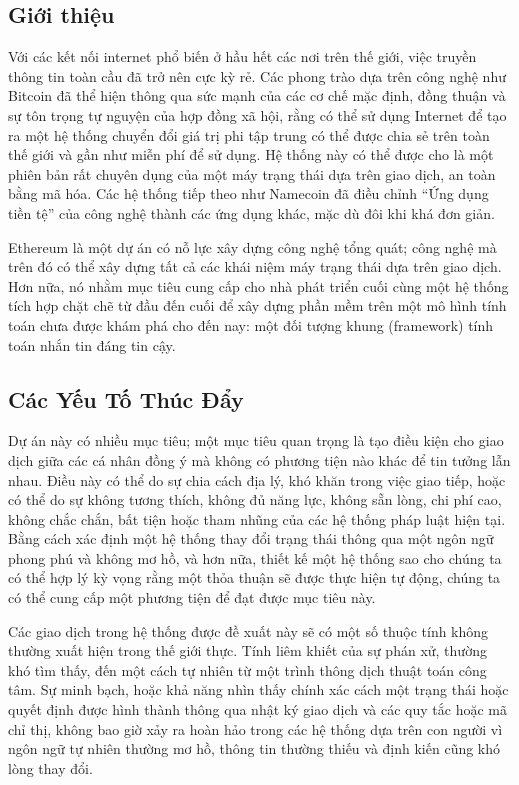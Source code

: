 \documentclass[9pt,oneside]{amsart}
\begin{document}
\setlength{\columnsep}{20pt}
\begin{multicols}{2}

\section[utf8]{Giới thiệu}\label{sec:introduction}

Với các kết nối internet phổ biến ở hầu hết các nơi trên thế giới, việc truyền thông tin toàn cầu đã trở nên cực kỳ rẻ. Các phong trào dựa trên công nghệ như Bitcoin đã thể hiện thông qua sức mạnh của các cơ chế mặc định, đồng thuận và sự tôn trọng tự nguyện của hợp đồng xã hội, rằng có thể sử dụng Internet để tạo ra một hệ thống chuyển đổi giá trị phi tập trung có thể được chia sẻ trên toàn thế giới và gần như miễn phí để sử dụng. Hệ thống này có thể được cho là một phiên bản rất chuyên dụng của một máy trạng thái dựa trên giao dịch, an toàn bằng mã hóa. Các hệ thống tiếp theo như Namecoin đã điều chỉnh ``Ứng dụng tiền tệ'' của công nghệ thành các ứng dụng khác, mặc dù đôi khi khá đơn giản.

Ethereum là một dự án có nỗ lực xây dựng công nghệ tổng quát; công nghệ mà trên đó có thể xây dựng tất cả các khái niệm máy trạng thái dựa trên giao dịch. Hơn nữa, nó nhằm mục tiêu cung cấp cho nhà phát triển cuối cùng một hệ thống tích hợp chặt chẽ từ đầu đến cuối để xây dựng phần mềm trên một mô hình tính toán chưa được khám phá cho đến nay: một đối tượng khung (framework) tính toán nhắn tin đáng tin cậy.

\subsection{Các Yếu Tố Thúc Đẩy} \label{ch:driving}

Dự án này có nhiều mục tiêu; một mục tiêu quan trọng là tạo điều kiện cho giao dịch giữa các cá nhân đồng ý mà không có phương tiện nào khác để tin tưởng lẫn nhau. Điều này có thể do sự chia cách địa lý, khó khăn trong việc giao tiếp, hoặc có thể do sự không tương thích, không đủ năng lực, không sẵn lòng, chi phí cao, không chắc chắn, bất tiện hoặc tham nhũng của các hệ thống pháp luật hiện tại. Bằng cách xác định một hệ thống thay đổi trạng thái thông qua một ngôn ngữ phong phú và không mơ hồ, và hơn nữa, thiết kế một hệ thống sao cho chúng ta có thể hợp lý kỳ vọng rằng một thỏa thuận sẽ được thực hiện tự động, chúng ta có thể cung cấp một phương tiện để đạt được mục tiêu này.

Các giao dịch trong hệ thống được đề xuất này sẽ có một số thuộc tính không thường xuất hiện trong thế giới thực. Tính liêm khiết của sự phán xử, thường khó tìm thấy, đến một cách tự nhiên từ một trình thông dịch thuật toán công tâm. Sự minh bạch, hoặc khả năng nhìn thấy chính xác cách một trạng thái hoặc quyết định được hình thành thông qua nhật ký giao dịch và các quy tắc hoặc mã chỉ thị, không bao giờ xảy ra hoàn hảo trong các hệ thống dựa trên con người vì ngôn ngữ tự nhiên thường mơ hồ, thông tin thường thiếu và định kiến cũng khó lòng thay đổi.


\end{multicols}
\end{document}

